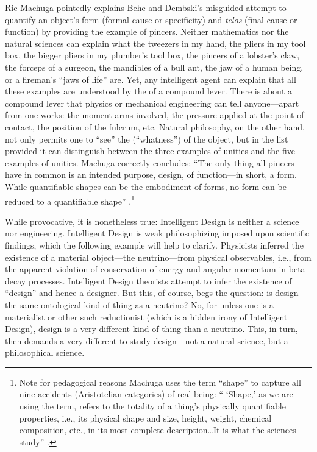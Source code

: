 Ric Machuga pointedly explains Behe and Dembski's misguided attempt to quantify an object's form (formal cause or specificity) and \textit{telos} (final cause or function) by providing the example of pincers. Neither mathematics nor the natural sciences can explain what the tweezers in my hand, the pliers in my tool box, the bigger pliers in my plumber's tool box, the pincers of a lobster's claw, the forceps of a surgeon, the mandibles of a bull ant, the jaw of a human being, or a fireman's ``jaws of life'' are. Yet, any intelligent agent can explain that all these examples are understood by the  of a compound lever. There is  about  a compound lever  that physics or mechanical engineering can tell anyone---apart from  one works: the moment arms involved, the pressure applied at the point of contact, the position of the fulcrum, etc. Natural philosophy, on the other hand, not only permits one to ``see'' the  (``whatness'') of the object, but in the list provided it can distinguish between the three examples of  unities and the five examples of  unities. Machuga correctly concludes: ``The only thing all pincers have in common is an intended purpose, design, of function---in short, a form. While quantifiable shapes can be the embodiment of forms, no form can be reduced to a quantifiable shape'' \cite[p.~162]{machuga}.\footnote{Note for pedagogical reasons Machuga uses the term ``shape'' to capture all nine accidents (Aristotelian categories) of real being: `` `Shape,' as we are using the term, refers to the totality of a thing's physically quantifiable properties, i.e., its physical shape and size, height, weight, chemical composition, etc., in its most complete description\ldots It is what the sciences study'' \citep[][p.~27]{machuga}.}

While provocative, it is nonetheless true: Intelligent Design is neither a science nor engineering. Intelligent Design is weak philosophizing imposed upon scientific findings, which the following example will help to clarify. Physicists inferred the existence of a material object---the neutrino---from physical observables, i.e., from the apparent violation of conservation of energy and angular momentum in beta decay processes. Intelligent Design theorists attempt to infer the existence of ``design'' and hence a designer. But this, of course, begs the question: is design the same ontological kind of thing as a neutrino? No, for unless one is a materialist or other such reductionist (which is a hidden irony of Intelligent Design), design is a very different kind of thing than a neutrino.  This, in turn, then demands a very different  to study design---not a natural science, but a philosophical science.

